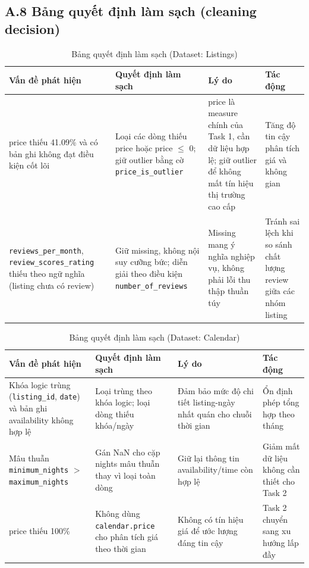 \subsection*{A.8 Bảng quyết định làm sạch (cleaning decision)}

\begin{table}[H]
\centering
\caption{Bảng quyết định làm sạch (Dataset: Listings)}\label{tab:A8-listings}
\small %
\renewcommand{\arraystretch}{1.3} %
\begin{tabularx}{\textwidth}{|>{\raggedright\arraybackslash}X|>{\raggedright\arraybackslash}X|>{\raggedright\arraybackslash}X|>{\raggedright\arraybackslash}X|}
\hline
\textbf{Vấn đề phát hiện} & \textbf{Quyết định làm sạch} & \textbf{Lý do} & \textbf{Tác động} \\
\hline
price thiếu 41.09\% và có bản ghi không đạt điều kiện cốt lõi & Loại các dòng thiếu price hoặc price $\leq$ 0; giữ outlier bằng cờ \texttt{price\_is\_outlier} & price là measure chính của Task 1, cần dữ liệu hợp lệ; giữ outlier để không mất tín hiệu thị trường cao cấp & Tăng độ tin cậy phân tích giá và không gian \\
\hline
\texttt{reviews\_per\_month}, \texttt{review\_scores\_rating} thiếu theo ngữ nghĩa (listing chưa có review) & Giữ missing, không nội suy cưỡng bức; diễn giải theo điều kiện \texttt{number\_of\_reviews} & Missing mang ý nghĩa nghiệp vụ, không phải lỗi thu thập thuần túy & Tránh sai lệch khi so sánh chất lượng review giữa các nhóm listing \\
\hline
\end{tabularx}
\end{table}

\begin{table}[H]
\centering
\caption{Bảng quyết định làm sạch (Dataset: Calendar)}\label{tab:A8-calendar}
\small
\renewcommand{\arraystretch}{1.3}
\begin{tabularx}{\textwidth}{|>{\raggedright\arraybackslash}X|>{\raggedright\arraybackslash}X|>{\raggedright\arraybackslash}X|>{\raggedright\arraybackslash}X|}
\hline
\textbf{Vấn đề phát hiện} & \textbf{Quyết định làm sạch} & \textbf{Lý do} & \textbf{Tác động} \\
\hline
Khóa logic trùng (\texttt{listing\_id}, \texttt{date}) và bản ghi availability không hợp lệ & Loại trùng theo khóa logic; loại dòng thiếu khóa/ngày & Đảm bảo mức độ chi tiết listing-ngày nhất quán cho chuỗi thời gian & Ổn định phép tổng hợp theo tháng \\
\hline
Mâu thuẫn \texttt{minimum\_nights} $>$ \texttt{maximum\_nights} & Gán NaN cho cặp nights mâu thuẫn thay vì loại toàn dòng & Giữ lại thông tin availability/time còn hợp lệ & Giảm mất dữ liệu không cần thiết cho Task 2 \\
\hline
price thiếu 100\% & Không dùng \texttt{calendar.price} cho phân tích giá theo thời gian & Không có tín hiệu giá để ước lượng đáng tin cậy & Task 2 chuyển sang xu hướng lấp đầy \\
\hline
\end{tabularx}
\end{table}


